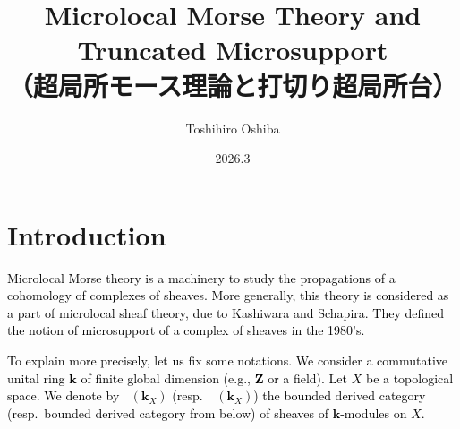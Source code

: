 ﻿\documentclass[a4paper,leqno,dvipdfmx]{jsarticle}
\title{
  Microlocal Morse Theory and Truncated Microsupport\\
  （超局所モース理論と打切り超局所台）
}
\author{Toshihiro Oshiba}
\date{
  2026.3
} %
\theoremstyle{definition}
\newcommand{\zz}{\mathbf{Z}}
\newcommand{\kk}{\mathbf{k}}
\numberwithin{equation}{section}
\newcommand{\Dompl}{\mathop{\mathsf{D}^\mathrm{+}}\nolimits}
\newcommand{\Dompb}{\mathop{\mathsf{D}^\mathrm{b}}\nolimits}
\theoremstyle{mystyle}
\begin{document}
\maketitle
\tableofcontents
\section{Introduction}\label{sec:intro}


\textcolor{black}{Microlocal Morse theory is a machinery 
to study the propagations of a cohomology 
of complexes of sheaves. 
More generally, this theory is considered as 
a part of microlocal sheaf theory, 
due to Kashiwara and Schapira. 
They defined the notion of 
microsupport of a complex of sheaves 
\textcolor{black}{in the 1980's}.} 

\textcolor{black}{To explain more precisely, 
\textcolor{black}{let us} fix some notations. 
We consider a commutative unital ring \(\kk\) 
of finite global dimension (e.g., \(\zz\) or a field). 
Let \(X\) be a topological space. 
We denote by \(\Dompb(\kk_X)\) (resp.\ \(\Dompl(\kk_{X})\)) 
the bounded derived category (resp.\ bounded 
derived category \textcolor{black}{from below}) of 
sheaves of \(\kk\)-modules on \(X\).} 
\end{document}
